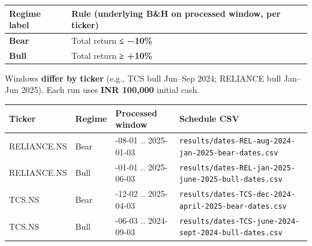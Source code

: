 \documentclass[
]{article}
\newcounter{none} %
\begin{document}
{\def\LTcaptype{none} %
\begin{longtable}[]{@{}
  >{\raggedright\arraybackslash}p{}
  >{\raggedright\arraybackslash}p{}@{}}
\toprule\noalign{}
\begin{minipage}[b]{\linewidth}\raggedright
Regime label
\end{minipage} & \begin{minipage}[b]{\linewidth}\raggedright
Rule (underlying B\&H on processed window, per ticker)
\end{minipage} \\
\midrule\noalign{}
\endhead
\bottomrule\noalign{}
\endlastfoot
\textbf{Bear} & Total return \textbf{≤ −10\%} \\
\textbf{Bull} & Total return \textbf{≥ +10\%} \\
\end{longtable}
}

Windows \textbf{differ by ticker} (e.g., TCS bull Jun--Sep 2024;
RELIANCE bull Jan--Jun 2025). Each run uses \textbf{INR 100,000} initial
cash.

{\def\LTcaptype{none} %
\begin{longtable}[]{@{}
  >{\raggedright\arraybackslash}p{}
  >{\raggedright\arraybackslash}p{}
  >{\raggedright\arraybackslash}p{}
  >{\raggedright\arraybackslash}p{}@{}}
\toprule\noalign{}
\begin{minipage}[b]{\linewidth}\raggedright
Ticker
\end{minipage} & \begin{minipage}[b]{\linewidth}\raggedright
Regime
\end{minipage} & \begin{minipage}[b]{\linewidth}\raggedright
Processed window
\end{minipage} & \begin{minipage}[b]{\linewidth}\raggedright
Schedule CSV
\end{minipage} \\
\midrule\noalign{}
\endhead
\bottomrule\noalign{}
\endlastfoot
RELIANCE.NS & Bear & 2024-08-01 .. 2025-01-03 &
\texttt{results/dates-REL-aug-2024-jan-2025-bear-dates.csv} \\
RELIANCE.NS & Bull & 2025-01-01 .. 2025-06-03 &
\texttt{results/dates-REL-jan-2025-june-2025-bull-dates.csv} \\
TCS.NS & Bear & 2024-12-02 .. 2025-04-03 &
\texttt{results/dates-TCS-dec-2024-april-2025-bear-dates.csv} \\
TCS.NS & Bull & 2024-06-03 .. 2024-09-03 &
\texttt{results/dates-TCS-june-2024-sept-2024-bull-dates.csv} \\
\end{longtable}
}
\end{document}
